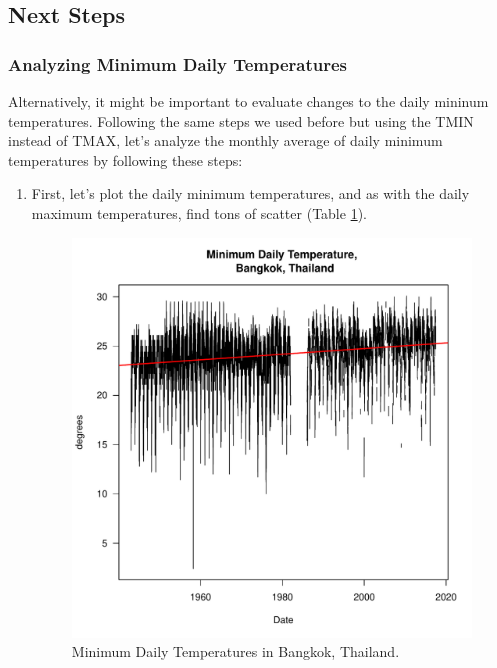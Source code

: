 \documentclass{article}\usepackage[]{graphicx}\usepackage[]{color}
\makeatletter
\def\maxwidth{ %
  \ifdim\Gin@nat@width>\linewidth
    \linewidth
  \else
    \Gin@nat@width
  \fi
}
\newenvironment{knitrout}{}{} %
\makeatother
\begin{document}
\subsection{Next Steps}

\subsubsection{Analyzing Minimum Daily Temperatures}

Alternatively, it might be important to evaluate changes to the daily mininum temperatures. Following the same steps we used before but using the TMIN instead of TMAX, let's analyze the monthly average of daily minimum temperatures by following these steps: 

\begin{enumerate}

\item First, let's plot the daily minimum temperatures, and as with the daily maximum temperatures, find tons of scatter (Table \ref{fig:TMIN_trend}).

\begin{figure}
\label{fig:TMIN_trend}
\caption{Minimum Daily Temperatures in Bangkok, Thailand.}
\begin{knitrout}
\color{fgcolor}
\includegraphics[width=\maxwidth]{figure/unnamed-chunk-16-1} 


\end{knitrout}
\end{figure}
\end{enumerate}
\end{document}
